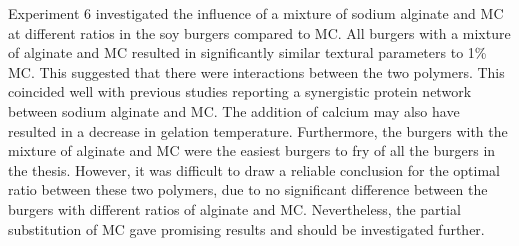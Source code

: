Experiment 6 investigated the influence of a mixture of sodium alginate and MC at different ratios in the soy burgers compared to MC. All burgers with a mixture of alginate and MC resulted in significantly similar textural parameters to 1\% MC. 
This suggested that there were interactions between the two polymers. This coincided well with previous studies reporting a synergistic protein network between sodium alginate and MC. The addition of calcium may also have resulted in a decrease in gelation temperature. 
Furthermore, the burgers with the mixture of alginate and MC were the easiest burgers to fry of all the burgers in the thesis. 
However, it was difficult to draw a reliable conclusion for the optimal ratio between these two
polymers, due to no significant difference between the burgers with different ratios of alginate and MC. Nevertheless, the partial substitution of MC gave promising results and should be investigated further.

